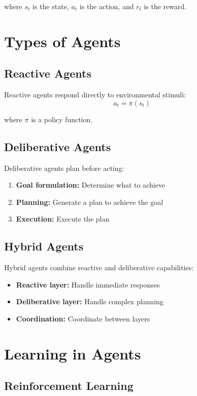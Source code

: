 where $s_t$ is the state, $a_t$ is the action, and $r_t$ is the reward.

\section{Types of Agents}

\subsection{Reactive Agents}

Reactive agents respond directly to environmental stimuli:
\begin{equation}
    a_t = \pi(s_t)
\end{equation}

where $\pi$ is a policy function.

\subsection{Deliberative Agents}

Deliberative agents plan before acting:
\begin{enumerate}
    \item \textbf{Goal formulation:} Determine what to achieve
    \item \textbf{Planning:} Generate a plan to achieve the goal
    \item \textbf{Execution:} Execute the plan
\end{enumerate}

\subsection{Hybrid Agents}

Hybrid agents combine reactive and deliberative capabilities:
\begin{itemize}
    \item \textbf{Reactive layer:} Handle immediate responses
    \item \textbf{Deliberative layer:} Handle complex planning
    \item \textbf{Coordination:} Coordinate between layers
\end{itemize}

\section{Learning in Agents}

\subsection{Reinforcement Learning}

